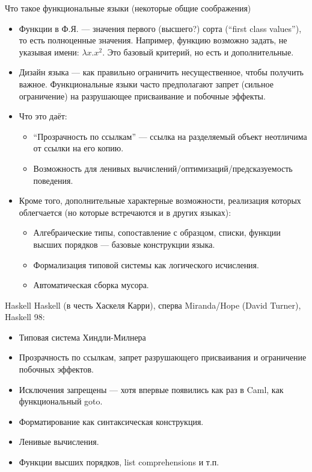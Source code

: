 \documentclass[aspectratio=169]{beamer}
\begin{document}
\begin{frame}{Что такое функциональные языки (некоторые общие соображения)}
\begin{itemize}
\item Функции в Ф.Я. --- значения первого (высшего?) сорта (``first class values''),
то есть полноценные значения. Например, функцию возможно задать, не указывая имени: $\lambda x.x^2$.
Это базовый критерий, но есть и дополнительные.

\item Дизайн языка --- как правильно ограничить несущественное, чтобы получить важное.
Функциональные языки часто предполагают запрет (сильное ограничение) на разрушающее присваивание и побочные эффекты.

\item Что это даёт:
\begin{itemize}
\item ``Прозрачность по ссылкам'' --- ссылка на разделяемый объект неотличима от ссылки на его копию.
\item Возможность для ленивых вычислений/оптимизаций/предсказуемость поведения.
\end{itemize}
\item Кроме того, дополнительные характерные возможности, реализация которых облегчается
(но которые встречаются и в других языках):\begin{itemize}
\item Алгебраические типы, сопоставление с образцом, списки, функции высших порядков --- базовые конструкции языка.
\item Формализация типовой системы как логического исчисления.
\item Автоматическая сборка мусора.
\end{itemize}
\end{itemize}
\end{frame}

\begin{frame}{Haskell}
Haskell (в честь Хаскеля Карри), сперва Miranda/Hope (David Turner), Haskell 98:

\begin{itemize}
\item Типовая система Хиндли-Милнера

\item Прозрачность по ссылкам, запрет разрушающего присваивания и ограничение побочных эффектов.

\item Исключения запрещены --- хотя впервые появились как раз в Caml, как функциональный goto. 

\item Форматирование как синтаксическая конструкция.

\item Ленивые вычисления.

\item Функции высших порядков, list comprehensions и т.п.
\end{itemize}
\end{frame}
\end{document}
